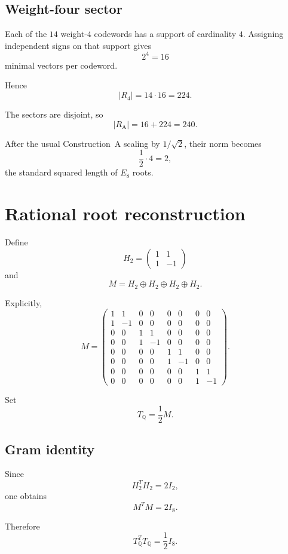 \documentclass[11pt,a4paper]{article}
\theoremstyle{definition}
\theoremstyle{remark}
\newcommand{\RA}{R_{\mathrm A}}
\newcommand{\TQ}{T_{\mathbb Q}}
\begin{document}
	\subsection{Weight-four sector}
	
	Each of the $14$ weight-$4$ codewords has a support of cardinality $4$.
	Assigning independent signs on that support gives
	\[
	2^4=16
	\]
	minimal vectors per codeword.
	
	Hence
	\[
	|R_4|
	=
	14\cdot16
	=
	224.
	\]
	
	The sectors are disjoint, so
	\[
	\boxed{
		|\RA|
		=
		16+224
		=
		240.
	}
	\]
	
	After the usual Construction~A scaling by $1/\sqrt2$, their norm becomes
	\[
	\frac12\cdot4=2,
	\]
	the standard squared length of $E_8$ roots.
	
	\section{Rational root reconstruction}
	
	Define
	\[
	H_2=
	\begin{pmatrix}
		1&1\\
		1&-1
	\end{pmatrix}
	\]
	and
	\[
	M=
	H_2\oplus H_2\oplus H_2\oplus H_2.
	\]
	
	Explicitly,
	\[
	M=
	\begin{pmatrix}
		1&1&0&0&0&0&0&0\\
		1&-1&0&0&0&0&0&0\\
		0&0&1&1&0&0&0&0\\
		0&0&1&-1&0&0&0&0\\
		0&0&0&0&1&1&0&0\\
		0&0&0&0&1&-1&0&0\\
		0&0&0&0&0&0&1&1\\
		0&0&0&0&0&0&1&-1
	\end{pmatrix}.
	\]
	
	Set
	\[
	\TQ=\frac12M.
	\]
	
	\subsection{Gram identity}
	
	Since
	\[
	H_2^TH_2=2I_2,
	\]
	one obtains
	\[
	M^TM=2I_8.
	\]
	
	Therefore
	\[
	\boxed{
		\TQ^T\TQ
		=
		\frac12I_8.
	}
	\]
	
\end{document}
